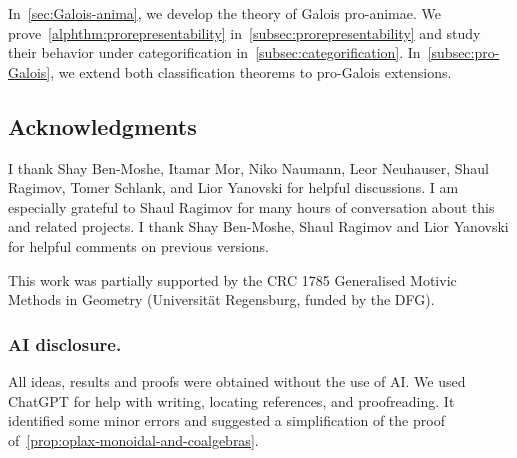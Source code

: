 \documentclass[english,svgnames,table]{article}
\begin{document}
    In~\cref{sec:Galois-anima}, we develop the theory of Galois pro-animae.
    We prove~\cref{alphthm:prorepresentability} in~\cref{subsec:prorepresentability} and study their behavior under categorification in~\cref{subsec:categorification}.
    In~\cref{subsec:pro-Galois}, we extend both classification theorems to pro-Galois extensions.



\subsection{Acknowledgments}
    I thank Shay Ben-Moshe, Itamar Mor, Niko Naumann, Leor Neuhauser, Shaul Ragimov, Tomer Schlank, and Lior Yanovski for helpful discussions. 
    I am especially grateful to Shaul Ragimov for many hours of conversation about this and related projects.
    I thank Shay Ben-Moshe, Shaul Ragimov and Lior Yanovski for helpful comments on previous versions. 
    
    This work was partially supported by the CRC 1785 Generalised Motivic Methods in Geometry (Universit\"at Regensburg, funded by the DFG).

    \subsubsection*{AI disclosure.}  
    All ideas, results and proofs were obtained without the use of AI.
    We used ChatGPT for help with writing, locating references, and proofreading. It identified some minor errors and suggested a simplification of the proof of~\cref{prop:oplax-monoidal-and-coalgebras}.
\end{document}

